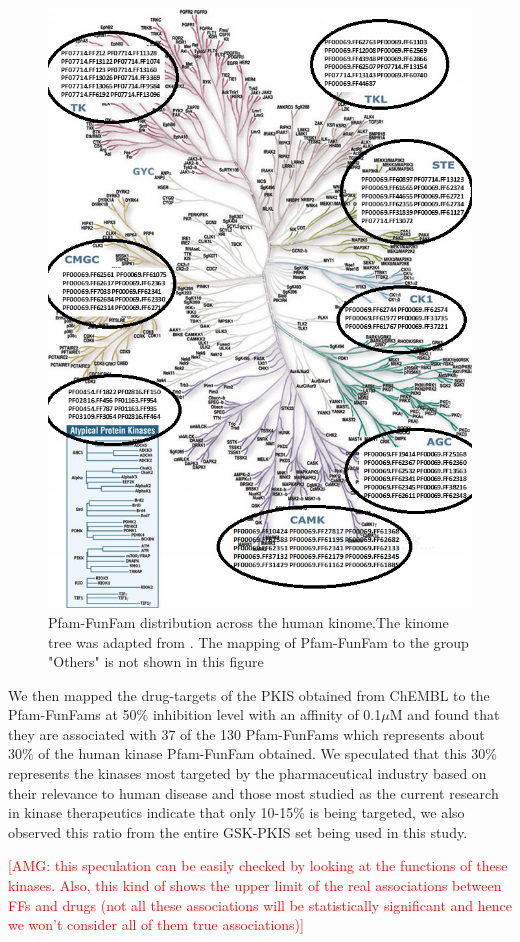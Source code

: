 \documentclass[a4paper, 11pt]{article}
\newcommand{\redcomment}[1]{\textcolor{red}{[#1]}} %
\begin{document}
\begin{figure}[H]
	\includegraphics[width=.9\linewidth]{figures/kinometree.jpg}
	\centering
	\caption{Pfam-FunFam distribution across the human kinome.The kinome tree was adapted from \cite{manning2002protein}. The mapping of Pfam-FunFam to the group "Others" is not shown in this figure}
	\label{kinasetree}
\end{figure}
We then mapped the drug-targets of the PKIS obtained from ChEMBL to the Pfam-FunFams at 50\% inhibition level with an affinity of 0.1$\mu$M and found that they are associated with 37 of the 130 Pfam-FunFams which represents about 30\% of the human kinase Pfam-FunFam obtained. We speculated that this 30\% represents the kinases most targeted by the pharmaceutical industry based on their relevance to human disease and those most studied as the current research in kinase therapeutics indicate that only 10-15\% is being targeted, we also observed this ratio from the entire GSK-PKIS set being used in this study.

\redcomment{AMG: this speculation can be easily checked by looking at the functions of these kinases. Also, this kind of shows the upper limit of the real associations between FFs and drugs (not all these associations will be statistically significant and hence we won't consider all of them true associations)}
\end{document}
